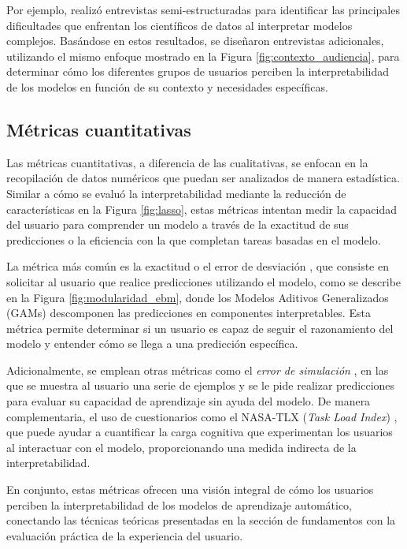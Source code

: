 Por ejemplo, \cite{Kaur-2020} realizó entrevistas semi-estructuradas para identificar las principales dificultades que enfrentan los científicos de datos al interpretar modelos complejos. Basándose en estos resultados, se diseñaron entrevistas adicionales, utilizando el mismo enfoque mostrado en la Figura \ref{fig:contexto_audiencia}, para determinar cómo los diferentes grupos de usuarios perciben la interpretabilidad de los modelos en función de su contexto y necesidades específicas.

\subsection{Métricas cuantitativas}

Las métricas cuantitativas, a diferencia de las cualitativas, se enfocan en la recopilación de datos numéricos que puedan ser analizados de manera estadística. Similar a cómo se evaluó la interpretabilidad mediante la reducción de características en la Figura \ref{fig:lasso}, estas métricas intentan medir la capacidad del usuario para comprender un modelo a través de la exactitud de sus predicciones o la eficiencia con la que completan tareas basadas en el modelo.

La métrica más común es la exactitud o el error de desviación \cite{lakkaraju-2016, Poursabzi-2021}, que consiste en solicitar al usuario que realice predicciones utilizando el modelo, como se describe en la Figura \ref{fig:modularidad_ebm}, donde los Modelos Aditivos Generalizados (GAMs) descomponen las predicciones en componentes interpretables. Esta métrica permite determinar si un usuario es capaz de seguir el razonamiento del modelo y entender cómo se llega a una predicción específica.

Adicionalmente, se emplean otras métricas como el \textit{error de simulación} \cite{Poursabzi-2021}, en las que se muestra al usuario una serie de ejemplos y se le pide realizar predicciones para evaluar su capacidad de aprendizaje sin ayuda del modelo. De manera complementaria, el uso de cuestionarios como el NASA-TLX (\emph{Task Load Index}) \cite{Hart-1988}, que puede ayudar a cuantificar la carga cognitiva que experimentan los usuarios al interactuar con el modelo, proporcionando una medida indirecta de la interpretabilidad.

En conjunto, estas métricas ofrecen una visión integral de cómo los usuarios perciben la interpretabilidad de los modelos de aprendizaje automático, conectando las técnicas teóricas presentadas en la sección de fundamentos con la evaluación práctica de la experiencia del usuario.

